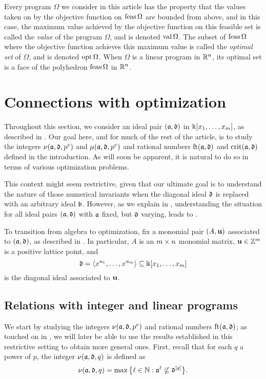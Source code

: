 \documentclass{amsart}
\begin{document}
Every program $\Omega$ we consider in this article has the property that the values taken on by the objective function on $\operatorname{feas} \Omega$ are bounded from above, and in this case, the maximum value achieved by the objective function on this feasible set is called the \emph{value} of the program $\Omega$, and is denoted $\operatorname{val} \Omega$.  The subset of $\operatorname{feas} \Omega$ where the objective function achieves this maximum value is called the \emph{optimal set} of $\Omega$, and is denoted $\operatorname{opt} \Omega$.   When $\Omega$ is a linear program in $\mathbb{R}^n$, its optimal set is a face of the polyhedron $\operatorname{feas} \Omega$ in $\mathbb{R}^n$.

\section{Connections with optimization}
\label{sec: LPs}

Throughout this section, we consider an ideal pair $(\mathfrak{a}, \mathfrak{d})$ in $\Bbbk[x_1, \ldots, x_{m}]$, as described in .
Our goal here, and for much of the rest of the article, is to study the integers $\nu(\mathfrak{a}, \mathfrak{d}, p^e)$ and $\mu(\mathfrak{a}, \mathfrak{d}, p^e)$ and rational numbers $\operatorname{ft}(\mathfrak{a}, \mathfrak{d})$ and $\operatorname{crit}(\mathfrak{a}, \mathfrak{d})$ defined in the introduction.
As will soon be apparent, it is natural to do so in terms of various optimization problems.

\begin{remark} \label{reduction to diagonal :R}
   This context might seem restrictive, given that our ultimate goal is to understand the nature of those numerical invariants when the diagonal ideal $\mathfrak{d}$ is replaced with an arbitrary ideal $\mathfrak{b}$.
   However, as we explain in , understanding the situation for all ideal pairs $(\mathfrak{a}, \mathfrak{d})$ with $\mathfrak{a}$ fixed, but $\mathfrak{d}$ varying, leads to .
\end{remark}

To transition from algebra to optimization, fix a monomial pair $(A, \mathbf{u})$ associated to $(\mathfrak{a}, \mathfrak{d})$, as described in .  In particular, $A$ is an $m \times n$ monomial matrix, $\mathbf{u} \in \mathbb{Z}^m$ is a positive lattice point, and
\[ \mathfrak{d} = \langle x^{u_1}, \ldots, x^{u_{m}} \rangle \subseteq \Bbbk[x_1, \ldots, x_{m}] \] is the diagonal ideal associated to $\mathbf{u}$.

\subsection{Relations with integer and linear programs}
We start by studying the integers $\nu(\mathfrak{a}, \mathfrak{d}, p^e)$ and rational numbers $\operatorname{ft}(\mathfrak{a}, \mathfrak{d})$; as touched on in , we will later be able to use the results established in this restrictive setting to obtain more general ones.
First, recall that for each $q$ a power of $p$, the integer $\nu(\mathfrak{a}, \mathfrak{d}, q)$ is defined as
\[\nu(\mathfrak{a},\mathfrak{d},q) = \max\big\{\ell \in \mathbb{N} : \mathfrak{a}^{\ell} \not\subseteq \mathfrak{d}^{[q]}\big\}.\]
\end{document}
